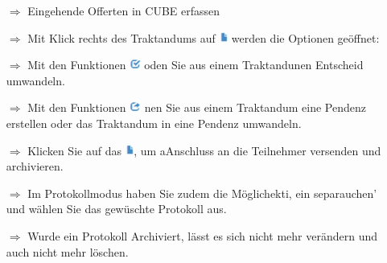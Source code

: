 \documentclass{article}
\begin{document}

\begin{multicols}{2}

\begin{tcolorbox}[colback=blue!5,colframe=blue!40!black,title=(3) Offerte(n) entgegennehmen und prüfen]
\begin{itemize}
  \item[$\Longrightarrow$] Eingehende Offerten in CUBE erfassen
	\item[$\Longrightarrow$] Mit Klick rechts des Traktandums auf \includegraphics[height=10pt]{Icons/Blattsymbol.jpg} werden die Optionen geöffnet:
  \item[$\Longrightarrow$] Mit den Funktionen \includegraphics[height=10pt]{Icons/Gutzeichen_Rahmen.jpg} oden Sie aus einem Traktandunen Entscheid umwandeln.
	\item[$\Longrightarrow$] Mit den Funktionen \includegraphics[height=10pt]{Icons/Pfeil_aus_Box.jpg} nen Sie aus einem Traktandum eine Pendenz erstellen oder das Traktandum in eine Pendenz umwandeln.
  \item[$\Longrightarrow$] Klicken Sie auf das \includegraphics[height=10pt]{Icons/Blattsymbol.jpg}, um aAnschluss an die Teilnehmer versenden und archivieren.
	\item[$\Longrightarrow$] Im Protokollmodus haben Sie zudem die Möglichekti, ein separauchen' und wählen Sie das gewüschte Protokoll aus.
	\item[$\Longrightarrow$] Wurde ein Protokoll Archiviert, lässt es sich nicht mehr verändern und auch nicht mehr löschen.
\end{itemize}
\end{tcolorbox}



\end{multicols}
\end{document}
